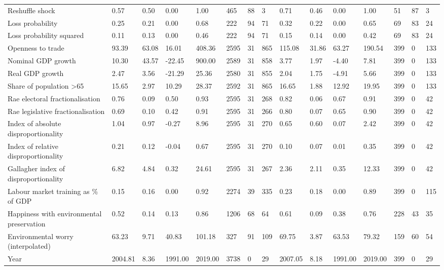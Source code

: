 \begin{longtable}{lllllllllllllll}
Reshuffle shock & 0.57 & 0.50 & 0.00 & 1.00 & 465 & 88 & 3 & 0.71 & 0.46 & 0.00 & 1.00 & 51 & 87 & 3\\
\addlinespace
Loss probability & 0.25 & 0.21 & 0.00 & 0.68 & 222 & 94 & 71 & 0.32 & 0.22 & 0.00 & 0.65 & 69 & 83 & 24\\
Loss probability squared & 0.11 & 0.13 & 0.00 & 0.46 & 222 & 94 & 71 & 0.15 & 0.14 & 0.00 & 0.42 & 69 & 83 & 24\\
Openness to trade & 93.39 & 63.08 & 16.01 & 408.36 & 2595 & 31 & 865 & 115.08 & 31.86 & 63.27 & 190.54 & 399 & 0 & 133\\
Nominal GDP growth & 10.30 & 43.57 & -22.45 & 900.00 & 2589 & 31 & 858 & 3.77 & 1.97 & -4.40 & 7.81 & 399 & 0 & 133\\
Real GDP growth & 2.47 & 3.56 & -21.29 & 25.36 & 2580 & 31 & 855 & 2.04 & 1.75 & -4.91 & 5.66 & 399 & 0 & 133\\
\addlinespace
Share of population >65 & 15.65 & 2.97 & 10.29 & 28.37 & 2592 & 31 & 865 & 16.65 & 1.88 & 12.92 & 19.95 & 399 & 0 & 133\\
Rae electoral fractionalisation & 0.76 & 0.09 & 0.50 & 0.93 & 2595 & 31 & 268 & 0.82 & 0.06 & 0.67 & 0.91 & 399 & 0 & 42\\
Rae legislative fractionalisation & 0.69 & 0.10 & 0.42 & 0.91 & 2595 & 31 & 266 & 0.80 & 0.07 & 0.65 & 0.90 & 399 & 0 & 42\\
Index of absolute disproportionality & 1.04 & 0.97 & -0.27 & 8.96 & 2595 & 31 & 270 & 0.65 & 0.60 & 0.07 & 2.42 & 399 & 0 & 42\\
Index of relative disproportionality & 0.21 & 0.12 & -0.04 & 0.67 & 2595 & 31 & 270 & 0.10 & 0.07 & 0.01 & 0.35 & 399 & 0 & 42\\
\addlinespace
Gallagher index of disproportionality & 6.82 & 4.84 & 0.32 & 24.61 & 2595 & 31 & 267 & 2.36 & 2.11 & 0.35 & 12.33 & 399 & 0 & 42\\
Labour market training as \% of GDP & 0.15 & 0.16 & 0.00 & 0.92 & 2274 & 39 & 335 & 0.23 & 0.18 & 0.00 & 0.89 & 399 & 0 & 115\\
Happiness with environmental preservation & 0.52 & 0.14 & 0.13 & 0.86 & 1206 & 68 & 64 & 0.61 & 0.09 & 0.38 & 0.76 & 228 & 43 & 35\\
Environmental worry (interpolated) & 63.23 & 9.71 & 40.83 & 101.18 & 327 & 91 & 109 & 69.75 & 3.87 & 63.53 & 79.32 & 159 & 60 & 54\\
Year & 2004.81 & 8.36 & 1991.00 & 2019.00 & 3738 & 0 & 29 & 2007.05 & 8.18 & 1991.00 & 2019.00 & 399 & 0 & 29\\
\bottomrule
\end{longtable}
